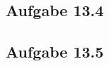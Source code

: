 \documentclass{standalone}
\begin{document}
\subsection{Aufgabe 13.4}


\subsection{Aufgabe 13.5}
\end{document}
